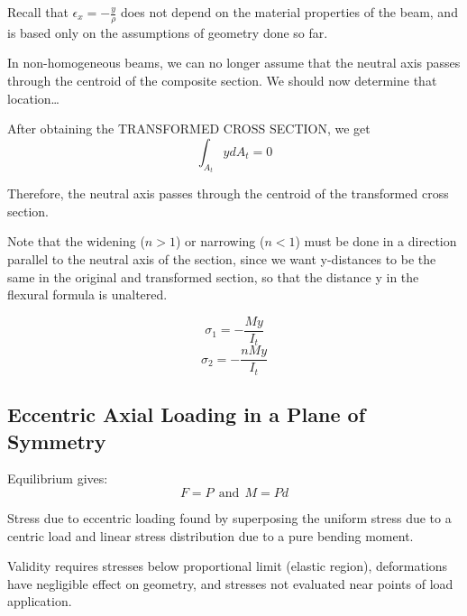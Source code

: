 Recall that $\epsilon_x = -\frac{y}{\rho}$ does not depend on the material properties of the beam, and is based only on the assumptions of geometry done so far.

\vspace{5pt}

\noindent \textbf{}

\vspace{5pt}

\noindent In non-homogeneous beams, we can no longer assume that the neutral axis passes through the centroid of the composite section. We should now determine that location…

\vspace{5pt}

\noindent After obtaining the TRANSFORMED CROSS SECTION, we get
\[\int_{A_t}y d A_t = 0\]

\noindent Therefore, the neutral axis passes through the centroid of the transformed cross section.

\noindent Note that the widening ($n > 1$) or narrowing ($n < 1$) must be done in a direction parallel to the neutral axis of the section, since we want y-distances to be the same in the original and transformed section, so that the distance y in the flexural formula is unaltered.

\[\sigma_1 = -\frac{My}{I_t}\]
\[\sigma_2 = -\frac{nMy}{I_t}\]


\subsection{Eccentric Axial Loading in a Plane of Symmetry}

Equilibrium gives:\[F=P \ \ \text{and} \ \ M=Pd\]

\noindent \textbf{}

\vspace{5pt}

\noindent Stress due to eccentric loading found by superposing the uniform stress due to a centric load and linear stress distribution due to a pure bending moment.

\vspace{5pt}

\noindent \textbf{}

\vspace{5pt}

\noindent Validity requires stresses below proportional limit (elastic region), deformations have negligible effect on geometry, and stresses not evaluated near points of load application.






